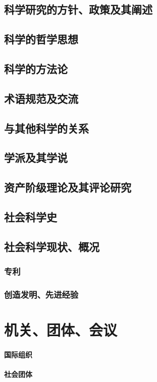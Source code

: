 \documentclass[UTF8]{../RepresentationUniverse}
\begin{document}
\section{科学研究的方针、政策及其阐述}
\section{科学的哲学思想}
\section{科学的方法论}
\section{术语规范及交流}
\section{与其他科学的关系}
\section{学派及其学说}
\section{资产阶级理论及其评论研究}
\section{社会科学史}
\section{社会科学现状、概况}
    \subsection{专利}
    \subsection{创造发明、先进经验}



\chapter{机关、团体、会议}
\subsubsection{国际组织}
\subsubsection{社会团体}
\end{document}
